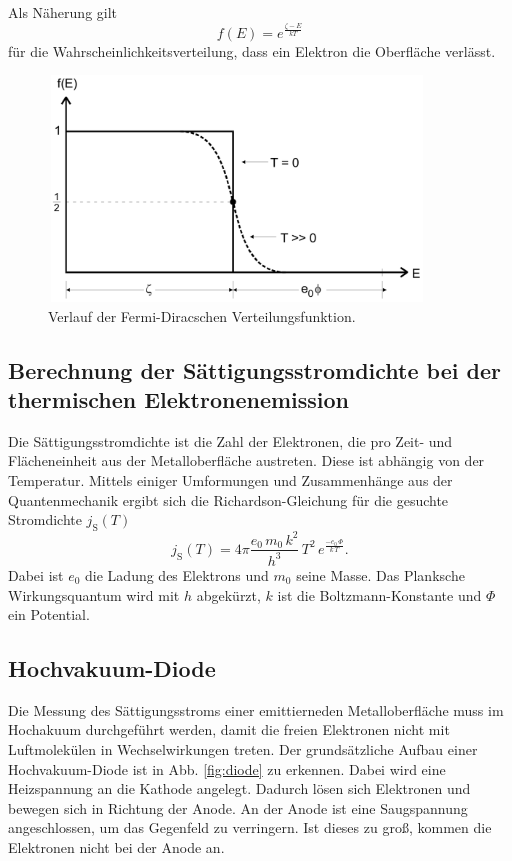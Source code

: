 \noindent Als Näherung gilt 
\begin{equation}
    f(E) = e^{\frac{\zeta - E}{k T}}
    \label{eqn:fermidirac}
\end{equation}
für die Wahrscheinlichkeitsverteilung, dass ein Elektron die 
Oberfläche  verlässt. 

\begin{figure}
    \centering
    \includegraphics[width=10cm, height=6cm]{build/fermidirac.png}
    \caption{Verlauf der Fermi-Diracschen Verteilungsfunktion. \cite{V504}}
    \label{fig:fermidirac}
\end{figure}

\subsection{Berechnung der Sättigungsstromdichte bei der 
thermischen Elektronenemission}

Die Sättigungsstromdichte ist die Zahl der 
Elektronen, die pro Zeit- und Flächeneinheit aus der 
Metalloberfläche austreten. Diese ist abhängig von der 
Temperatur. Mittels einiger Umformungen und 
Zusammenhänge aus der Quantenmechanik ergibt sich die 
Richardson-Gleichung für die gesuchte Stromdichte $j_\text{S}(T)$ 
\begin{equation}
    j_\text{S}(T)= 4 \pi \frac{e_0 \, m_0 \, k^2}{h^3} \, T^2 \, e^{\frac{-e_0 \, \Phi}{k \, T}}.
    \label{eqn:richardson}
\end{equation} 
Dabei ist $e_0$ die Ladung des Elektrons und $m_0$ seine Masse. 
Das Planksche Wirkungsquantum wird mit $h$ abgekürzt, $k$ ist 
die Boltzmann-Konstante und $\Phi$ ein Potential. %

\subsection{Hochvakuum-Diode}

Die Messung des Sättigungsstroms einer emittierneden 
Metalloberfläche muss im Hochakuum durchgeführt werden, 
damit die freien Elektronen nicht mit Luftmolekülen in 
Wechselwirkungen treten. Der grundsätzliche Aufbau einer 
Hochvakuum-Diode ist in Abb. \ref{fig:diode} zu erkennen.
Dabei wird eine Heizspannung an die Kathode angelegt. Dadurch 
lösen sich Elektronen und bewegen sich in Richtung der Anode. 
An der Anode ist eine Saugspannung angeschlossen, um das 
Gegenfeld zu verringern. Ist dieses zu groß, kommen die 
Elektronen nicht bei der Anode an. 

